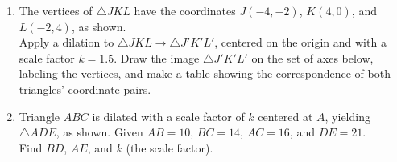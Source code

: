 \documentclass[12pt, twoside]{article}
\begin{document}
\begin{enumerate}
\newpage
  \item The vertices of $\triangle JKL$ have the coordinates $J(-4,-2)$, $K(4,0)$, and $L(-2,4)$, as shown. \\[0.25cm]
    Apply a dilation to $\triangle JKL \rightarrow \triangle J'K'L'$, centered on the origin and with a scale factor $k=1.5$. Draw the image $\triangle J'K'L'$ on the set of axes below, labeling the vertices, and make a table showing the correspondence of both triangles' coordinate pairs.  \vspace{4cm}
    \begin{center}
    \end{center}

\newpage
 \item Triangle $ABC$ is dilated with a scale factor of $k$ centered at $A$, yielding $\triangle ADE$, as shown. Given $AB=10$, $BC=14$, $AC=16$, and $DE=21$. \\[0.25cm] Find $BD$, $AE$, and $k$ (the scale factor). \vspace{0.5cm}
 \begin{center}
   \end{center}
\vspace{4cm}



\end{enumerate}
\end{document}
